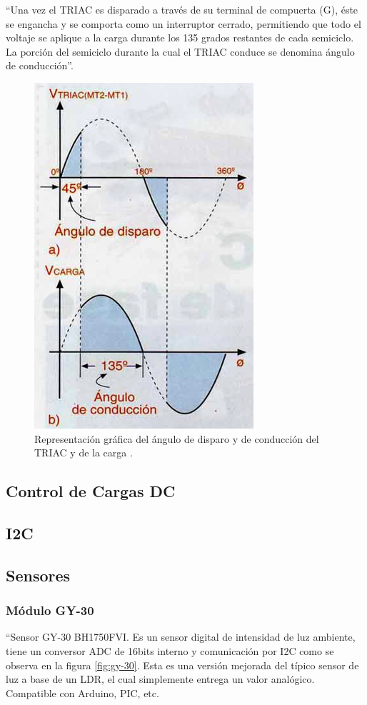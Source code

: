 ``Una vez el TRIAC es disparado a través de su terminal de compuerta (G), éste se engancha y se comporta como un interruptor cerrado, permitiendo que todo el voltaje se aplique a la carga durante los 135 grados restantes de cada semiciclo. La porción del semiciclo durante la cual el TRIAC conduce se denomina ángulo de conducción''\cite{CEKIT}.

\begin{figure}[H]
	\centering
	\caption{Representación gráfica del ángulo de disparo y de conducción del TRIAC y de la carga \cite{CEKIT}.}
	\label{fig:triacgraph}
	\includegraphics[width=0.3\linewidth]{Imagenes/TRIAC_graph}
\end{figure}

\subsection{Control de Cargas DC}


\subsection{I2C}

\subsection{Sensores}

\subsubsection{Módulo GY-30}

``Sensor GY-30 BH1750FVI. Es un sensor digital de intensidad de luz ambiente, tiene un conversor ADC de 16bits interno y comunicación por I2C como se observa en la figura \ref{fig:gy-30}. Esta es una versión mejorada del típico sensor de luz a base de un LDR, el cual simplemente entrega un valor analógico. Compatible con Arduino, PIC, etc. \\

